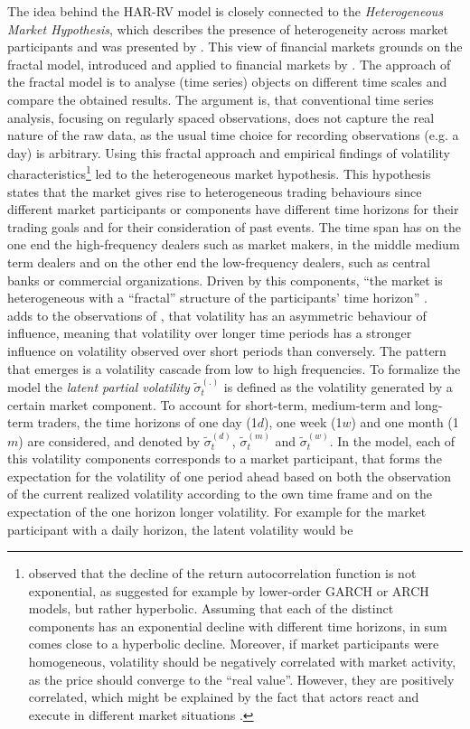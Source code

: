 The idea behind the HAR-RV model is closely connected to the \emph{Heterogeneous Market Hypothesis}, which describes the presence of heterogeneity across market participants and was presented by \textcite{mueller1993}. This view of financial markets grounds on the fractal model, introduced and applied to financial markets by \textcite{mandelbrot1963}. The approach of the fractal model is to analyse (time series) objects on different time scales and compare the obtained results. The argument is, that conventional time series analysis, focusing on regularly spaced observations, does not capture the real nature of the raw data, as the usual time choice for recording observations (e.g. a day) is arbitrary. Using this fractal approach and empirical findings of volatility characteristics\footnote{\textcite{mueller1993} observed that the decline of the return autocorrelation function is not exponential, as suggested for example by lower-order GARCH or ARCH models, but rather hyperbolic. Assuming that each of the distinct components has an exponential decline with different time horizons, in sum comes close to a hyperbolic decline. Moreover, if market participants were homogeneous, volatility should be negatively correlated with market activity, as the price should converge to the ``real value''. However, they are positively correlated, which might be explained by the fact that actors react and execute in different market situations \parencite{mueller1993}.} led to the heterogeneous market hypothesis. This hypothesis states that the market gives rise to heterogeneous trading behaviours since different market participants or components have different time horizons for their trading goals and for their consideration of past events. The time span has on the one end the high-frequency dealers such as market makers, in the middle medium term dealers and on the other end the low-frequency dealers, such as central banks or commercial organizations. Driven by this components, ``the market is heterogeneous with a ``fractal'' structure of the participants' time horizon'' \parencite[p.12]{mueller1993}.\\
\textcite{corsi2009} adds to the observations of \textcite{mueller1993}, that volatility has an asymmetric behaviour of influence, meaning that volatility over longer time periods has a stronger influence on volatility observed over short periods than conversely. The pattern that emerges is a volatility cascade from low to high frequencies. To formalize the model the \emph{latent partial volatility} $\tilde{\sigma}_{t}^{(.)}$ is defined as the volatility generated by a certain market component. To account for short-term, medium-term and long-term traders, the time horizons of one day (1$d$), one week (1$w$) and one month (1$m$) are considered, and denoted by $\tilde{\sigma}_{t}^{(d)}$, $\tilde{\sigma}_{t}^{(m)}$ and $\tilde{\sigma}_{t}^{(w)}$. In the model, each of this volatility components corresponds to a market participant, that forms the expectation for the volatility of one period ahead based on both the observation of the current realized volatility according to the own time frame and on the expectation of the one horizon longer volatility. For example for the market participant with a daily horizon, the latent volatility would be
